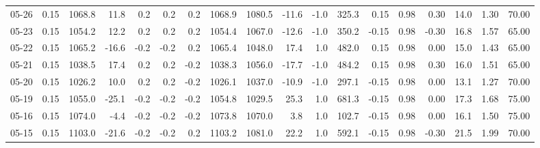\begin{threeparttable}
{\begin{tabular}{lrrrrrrrrrrrrrrrrr}
  05-26 &     0.15 & 1068.8 &              11.8 &               0.2 &                0.2 &                0.2 & 1068.9 & 1080.5 &      -11.6 &                     -1.0 &               325.3 &       0.15 &      0.98 &           0.30 &             14.0 &            1.30 &                  70.00 \\
  05-23 &     0.15 & 1054.2 &              12.2 &               0.2 &                0.2 &                0.2 & 1054.4 & 1067.0 &      -12.6 &                     -1.0 &               350.2 &      -0.15 &      0.98 &          -0.30 &             16.8 &            1.57 &                  65.00 \\
  05-22 &     0.15 & 1065.2 &             -16.6 &              -0.2 &               -0.2 &                0.2 & 1065.4 & 1048.0 &       17.4 &                      1.0 &               482.0 &       0.15 &      0.98 &           0.00 &             15.0 &            1.43 &                  65.00 \\
  05-21 &     0.15 & 1038.5 &              17.4 &               0.2 &                0.2 &               -0.2 & 1038.3 & 1056.0 &      -17.7 &                     -1.0 &               484.2 &       0.15 &      0.98 &           0.30 &             16.0 &            1.51 &                  65.00 \\
  05-20 &     0.15 & 1026.2 &              10.0 &               0.2 &                0.2 &               -0.2 & 1026.1 & 1037.0 &      -10.9 &                     -1.0 &               297.1 &      -0.15 &      0.98 &           0.00 &             13.1 &            1.27 &                  70.00 \\
  05-19 &     0.15 & 1055.0 &             -25.1 &              -0.2 &               -0.2 &               -0.2 & 1054.8 & 1029.5 &       25.3 &                      1.0 &               681.3 &      -0.15 &      0.98 &           0.00 &             17.3 &            1.68 &                  75.00 \\
  05-16 &     0.15 & 1074.0 &              -4.4 &              -0.2 &               -0.2 &               -0.2 & 1073.8 & 1070.0 &        3.8 &                      1.0 &               102.7 &      -0.15 &      0.98 &           0.00 &             16.1 &            1.50 &                  75.00 \\
  05-15 &     0.15 & 1103.0 &             -21.6 &              -0.2 &               -0.2 &                0.2 & 1103.2 & 1081.0 &       22.2 &                      1.0 &               592.1 &      -0.15 &      0.98 &          -0.30 &             21.5 &            1.99 &                  70.00 \\

\end{tabular}}
\end{threeparttable}
